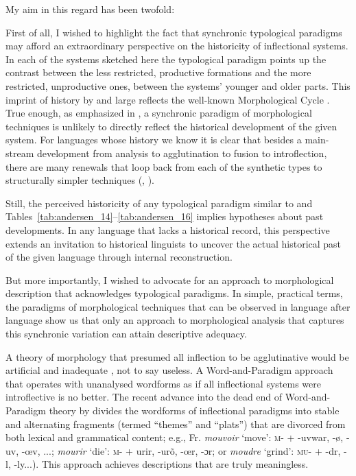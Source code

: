 \documentclass[output=paper, colorlinks,citecolor=brown]{langsci/langscibook}
\begin{document}
My aim in this regard has been twofold: 

First of all, I wished to highlight the fact that synchronic typological paradigms may afford an extraordinary perspective on the historicity of inflectional systems. In each of the systems sketched here the typological paradigm points up the contrast between the less restricted, productive formations and the more restricted, unproductive ones, between the systems' younger and older parts. This imprint of history by and large reflects the well-known Morphological Cycle \citep{Hodge1970}. True enough, as emphasized in , a synchronic paradigm of morphological techniques is unlikely to directly reflect the historical development of the given system. For languages whose history we know it is clear that besides a main-stream development from analysis to agglutination to fusion to introflection, there are many renewals that loop back from each of the synthetic types to structurally simpler techniques (\citealt{Werner1987}, \citealt{Igartua2015}).  

Still, the perceived historicity of any typological paradigm similar to  and Tables~\ref{tab:andersen_14}--\ref{tab:andersen_16} implies hypotheses about past developments. In any language that lacks a historical record, this perspective extends an invitation to historical linguists to uncover the actual historical past of the given language through internal reconstruction. 

But more importantly, I wished to advocate for an approach to morphological description that acknowledges typological paradigms. In simple, practical terms, the paradigms of morphological techniques that can be observed in language after language show us that only an approach to morphological analysis that captures this synchronic variation can attain descriptive adequacy. 

A theory of morphology that presumed all inflection to be agglutinative would be artificial and inadequate \citep{Hockett1954}, not to say useless. A Word-and-Par\-a\-digm approach that operates with unanalysed wordforms as if all inflectional systems were introflective is no better. The recent advance into the dead end of Word-and-Paradigm theory by \citet{StumpFinkel2017} divides the wordforms of inflectional paradigms into stable and alternating fragments (termed ``themes” and ``plats”) that are divorced from both lexical and grammatical content; e.g., Fr. \textit{mouvoir} ‘move': \textsc{m}{}- + -uvwar, -ø, -uv, -œv, ...; \textit{mourir} ‘die': \textsc{m}{}- + urir, -urõ, -œr, -ɔr; or \textit{moudre} ‘grind': \textsc{mu}{}- + -dr, -l, -ly...). This approach achieves descriptions that are truly meaningless.
\end{document}
